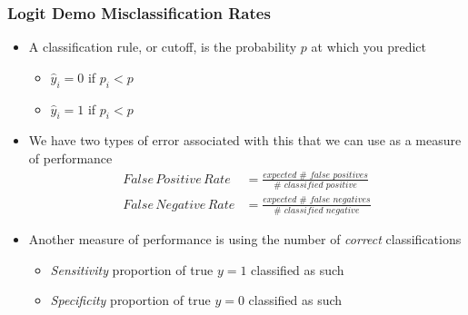 \documentclass[
  shownotes,
  xcolor={svgnames},
  hyperref={colorlinks,citecolor=DarkBlue,linkcolor=DarkRed,urlcolor=DarkBlue}
  , aspectratio=169]{beamer}
\begin{document}
\begin{frame}[fragile]
\frametitle{Logit Demo Misclassification Rates}

\begin{itemize}
  \item A classification rule, or cutoff, is the probability $p$ at which you predict
  \medskip
  \begin{itemize}
    \item $\hat y_i =0$ if $p_i < p$
    \item $\hat y_i = 1$ if $p_i < p$
  \end{itemize}
  \bigskip
  \item We have two types of error associated with this that we can use as a measure of performance
  \begin{align}
     False\,Positive\,Rate&=\frac{expected\,\,\#\,\,false\,\,positives}{\#\,\,classified \,\,positive} \nonumber \\
     False\,Negative\,Rate&=\frac{expected\,\,\#\,\,false\,\,negatives}{\#\,\,classified \,\,negative} 
  \end{align}
     
  \item Another measure of performance is using the number of {\it correct} classifications
  \begin{itemize}
  \item {\it Sensitivity} proportion of true $y=1$ classified as such
  \item {\it Specificity} proportion of true $y=0$ classified as such
  \end{itemize}
  
\end{itemize}

\end{frame}
\end{document}
